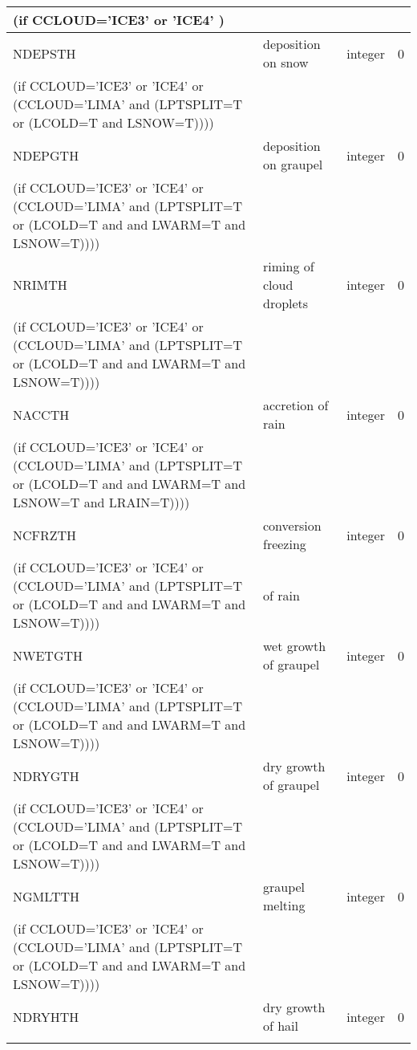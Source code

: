 \begin{longtable} {|p{}|p{}|>{\centering}p{}|p{}<{\centering}|}
(if CCLOUD='ICE3' or 'ICE4' ) & &   &  \\\hline
NDEPSTH  & deposition on snow  & integer  &  0 \index{NDEPSTH!\innam{NAM\_BU\_RTH}}\\ \nopagebreak
(if CCLOUD='ICE3' or 'ICE4' or (CCLOUD='LIMA' and (LPTSPLIT=T or (LCOLD=T and LSNOW=T)))) & &   &  \\\hline
NDEPGTH  & deposition on graupel & integer  &  0 \index{NDEPGTH!\innam{NAM\_BU\_RTH}}\\ \nopagebreak
(if CCLOUD='ICE3' or 'ICE4' or (CCLOUD='LIMA' and (LPTSPLIT=T or (LCOLD=T and and LWARM=T and LSNOW=T)))) & &   &  \\\hline
NRIMTH   & riming of cloud droplets & integer  &  0 \index{NRIMTH!\innam{NAM\_BU\_RTH}}\\ \nopagebreak
(if CCLOUD='ICE3' or 'ICE4' or (CCLOUD='LIMA' and (LPTSPLIT=T or (LCOLD=T and and LWARM=T and LSNOW=T)))) & &   &  \\\hline
NACCTH   & accretion of rain   & integer  &  0 \index{NACCTH!\innam{NAM\_BU\_RTH}}\\ \nopagebreak
(if CCLOUD='ICE3' or 'ICE4' or (CCLOUD='LIMA' and (LPTSPLIT=T or (LCOLD=T and and LWARM=T and LSNOW=T and LRAIN=T)))) & &   &  \\\hline
NCFRZTH  & conversion freezing & integer  &  0 \index{NCFRZTH!\innam{NAM\_BU\_RTH}}\\ \nopagebreak
(if CCLOUD='ICE3' or 'ICE4' or (CCLOUD='LIMA' and (LPTSPLIT=T or (LCOLD=T and and LWARM=T and LSNOW=T)))) & of rain &   &  \\\hline
NWETGTH  & wet growth of graupel& integer  &  0 \index{NWETGTH!\innam{NAM\_BU\_RTH}}\\ \nopagebreak
(if CCLOUD='ICE3' or 'ICE4' or (CCLOUD='LIMA' and (LPTSPLIT=T or (LCOLD=T and and LWARM=T and LSNOW=T)))) & &   &  \\\hline
NDRYGTH  & dry growth of graupel& integer  &  0 \index{NDRYGTH!\innam{NAM\_BU\_RTH}}\\ \nopagebreak
(if CCLOUD='ICE3' or 'ICE4' or (CCLOUD='LIMA' and (LPTSPLIT=T or (LCOLD=T and and LWARM=T and LSNOW=T)))) & &   &  \\\hline
NGMLTTH  & graupel melting      & integer  &  0 \index{NGMLTTH!\innam{NAM\_BU\_RTH}}\\ \nopagebreak
(if CCLOUD='ICE3' or 'ICE4' or (CCLOUD='LIMA' and (LPTSPLIT=T or (LCOLD=T and and LWARM=T and LSNOW=T)))) & &   &  \\\hline
NDRYHTH  & dry growth of hail          & integer  &  0 \index{NDRYHTH!\innam{NAM\_BU\_RTH}}\\ \nopagebreak

\end{longtable}
